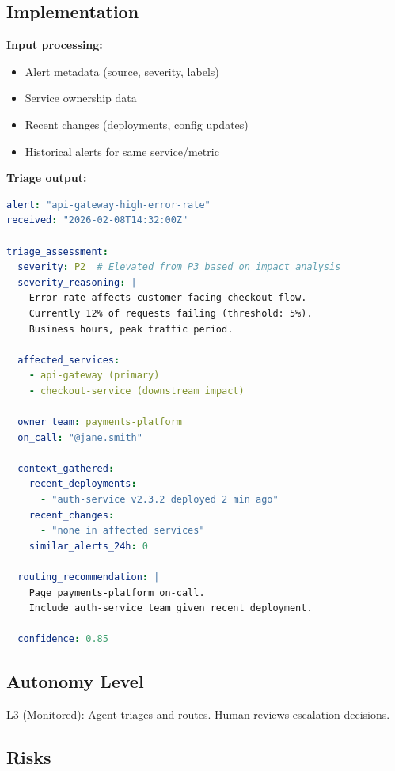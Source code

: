 \subsection{Implementation}

\textbf{Input processing:}
\begin{itemize}
    \item Alert metadata (source, severity, labels)
    \item Service ownership data
    \item Recent changes (deployments, config updates)
    \item Historical alerts for same service/metric
\end{itemize}

\textbf{Triage output:}

\begin{lstlisting}[language=yaml,caption={Automated Triage Output Example}]
alert: "api-gateway-high-error-rate"
received: "2026-02-08T14:32:00Z"

triage_assessment:
  severity: P2  # Elevated from P3 based on impact analysis
  severity_reasoning: |
    Error rate affects customer-facing checkout flow.
    Currently 12% of requests failing (threshold: 5%).
    Business hours, peak traffic period.

  affected_services:
    - api-gateway (primary)
    - checkout-service (downstream impact)

  owner_team: payments-platform
  on_call: "@jane.smith"

  context_gathered:
    recent_deployments:
      - "auth-service v2.3.2 deployed 2 min ago"
    recent_changes:
      - "none in affected services"
    similar_alerts_24h: 0

  routing_recommendation: |
    Page payments-platform on-call.
    Include auth-service team given recent deployment.

  confidence: 0.85
\end{lstlisting}

\subsection{Autonomy Level}

L3 (Monitored): Agent triages and routes. Human reviews escalation decisions.

\subsection{Risks}

